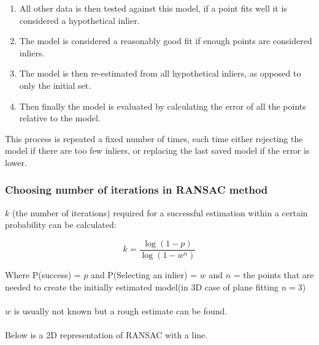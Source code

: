 			\begin{enumerate}
				\item All other data is then tested against this model, if a point fits well it is considered a hypothetical inlier.
				
				\item The model is considered a reasonably good fit if enough points are considered inliers.
				
				\item The model is then re-estimated from all hypothetical inliers, as opposed to only the initial set.
				
				\item Then finally the model is evaluated by calculating the error of all the points relative to the model.
			\end{enumerate}
			
			This process is repeated a fixed number of times, each time either rejecting the model if there are too few inliers, or replacing the last saved model if the error is lower.
			
			
			\subsubsection{Choosing number of iterations in RANSAC method}
				$k$ (the number of iterations) required for a successful estimation within a certain probability can be calculated:
				
				\begin{equation}
					k = \frac{\log(1-p)}{\log(1- w^n)}
				\end{equation}
				
				Where P(success) = $p$ and P(Selecting an inlier) = $w$ and $n$ = the points that are needed to create the initially estimated model(in 3D case of plane fitting $n = 3$)\\
				\\
				$w$ is usually not known but a rough estimate can be found.\\
				\\
				Below is a 2D representation of RANSAC with a line.
			
